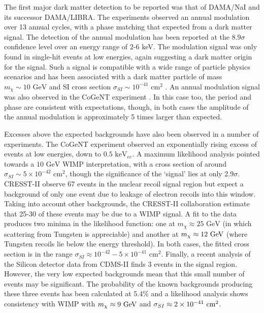 The first major dark matter detection to be reported was that of DAMA/NaI \cite{Bernabei:2003} and its successor DAMA/LIBRA. The experiments observed an annual modulation over 13 annual cycles, with a phase matching that expected from a dark matter signal. The detection of the annual modulation has been reported at the $8.9\sigma$ confidence level over an energy range of 2-6 keV. The modulation signal was only found in single-hit events at low energies, again suggesting a dark matter origin for the signal. Such a signal is compatible with a wide range of particle physics scenarios \cite{} and has been associated with a dark matter particle of mass $m_\chi \sim 10 \textrm{ GeV}$ and SI cross section $\sigma_{SI} \sim 10^{-41} \textrm{ cm}^2$ \cite{Belli:2011}. An annual modulation signal was also observed in the CoGeNT experiment \cite{Aalseth:2011b, Aalseth:2014a}. In this case too, the period and phase are consistent with expectations, though, in both cases the amplitude of the annual modulation is approximately 5 times larger than expected. 

Excesses above the expected backgrounds have also been observed in a number of experiments.%
The CoGeNT experiment observed an exponentially rising excess of events at low energies, down to $0.5 \textrm{ keV}_{ee}$. A maximum likelihood analysis \cite{Aalseth:2014b} pointed towards a $10 \textrm{ GeV}$ WIMP interpretation, with a cross section of around $\sigma_{SI} \sim 5 \times 10^{-42} \textrm{ cm}^2$, though the significance of the `signal' lies at only 2.9$\sigma$. CRESST-II observe 67 events in the nuclear recoil signal region but expect a background of only one event due to leakage of electron recoils into this window. Taking into account other backgrounds, the CRESST-II collaboration estimate that 25-30 of these events may be due to a WIMP signal. A fit to the data produces two minima in the likelihood function: one at $m_\chi \approx 25 \textrm{ GeV}$ (in which scattering from Tungsten is appreciable) and another at $m_\chi \approx 12 \textrm{ GeV}$ (where Tungsten recoils lie below the energy threshold). In both cases, the fitted cross section is in the range $\sigma_{SI} \approx 10^{-42} - 5 \times 10^{-41} \textrm{ cm}^2$. Finally, a recent analysis of the Silicon detector data from CDMS-II finds 3 events in the signal region. However, the very low expected backgrounds mean that this small number of events may be significant. The probability of the known backgrounds producing these three events has been calculated at 5.4\% and a likelihood analysis shows consistency with WIMP with $m_\chi \approx 9 \textrm{ GeV}$ and $\sigma_{SI} \approx 2 \times 10^{-41} \textrm{ cm}^2$.

